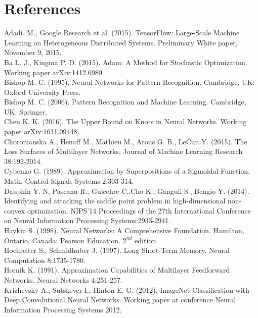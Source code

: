 \documentclass[11pt, letterpaper]{amsart}
\begin{document}
\newpage

\section{References}
Adadi. M., Google Research et al. (2015). TensorFlow: Large-Scale Machine Learning on Heterogeneous Distributed Systems. Preliminary White paper, November 9, 2015.
\\

Ba L. J., Kingma P. D. (2015). Adam: A Method for Stochastic Optimization. Working paper arXiv:1412.6980.
\\

Bishop M. C. (1995). Neural Networks for Pattern Recognition. Cambridge, UK: Oxford University Press.
\\

Bishop M. C. (2006). Pattern Recognition and Machine Learning. Cambridge, UK: Springer.
\\

Chen K. K. (2016). The Upper Bound on Knots in Neural Networks. Working paper arXiv:1611.09448.
\\

Choromanska A., Henaff M., Mathieu M., Arous G. B., LeCun Y. (2015). The Loss Surfaces of Multilayer Networks. Journal of Machine Learning Research 38:192-2014.
\\

Cybenko G. (1989). Approximation by Superpositions of a Sigmoidal Function. Math. Control Signals Systems 2:303-314.
\\

Dauphin Y. N, Pascanu R., Gulcehre C.,Cho K., Ganguli S., Bengio Y. (2014). Identifying and attacking the saddle point problem in high-dimensional non-convex optimization. NIPS'14 Proceedings of the 27th International Conference on Neural Information Processing Systems:2933-2941.
\\

Haykin S. (1998). Neural Networks: A Comprehensive Foundation. Hamilton, Ontario, Canada: Pearson Education. $2^{nd}$ edition.
\\

Hochreiter S., Schmidhuber J. (1997). Long Short-Term Memory. Neural Computation 8:1735-1780.
\\

Hornik K. (1991). Approximation Capabilities of Multilayer Feedforward Networks. Neural Networks 4:251-257.
\\

Krizhevsky A., Sutskever I., Hinton E. G. (2012). ImageNet Classification with Deep Convolutional Neural Networks. Working paper at conference Neural Information Processing Systems 2012.
\\
\end{document}
